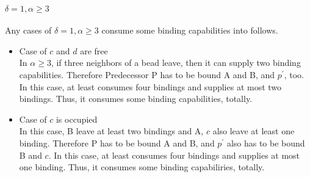\documentclass[runningheads]{llncs}
\begin{document}
\paragraph{$\delta = 1, \alpha \geq 3$}
Any cases of $\delta = 1, \alpha \geq 3$ consume some binding capabilities into follows.

\begin{itemize}
\item{Case of $c$ and $d$ are free}\\
  In $\alpha \geq 3$, if three neighbors of a bead leave, then it can supply two binding capabilities. Therefore Predecessor P has to be bound A and B, and $p^\prime$, too. In this case, at least consumes four bindings and supplies at most two bindings. Thus, it consumes some binding capabilities, totally.
  
\item{Case of $c$ is occupied}\\
  In this case, B leave at least two bindings and A, $c$ also leave at least one binding. Therefore P has to be bound A and B, and $p^\prime$ also has to be bound B and $c$. In this case, at least consumes four bindings and supplies at most one binding. Thus, it consumes some binding capabiliries, totally.
\end{itemize}
\end{document}
